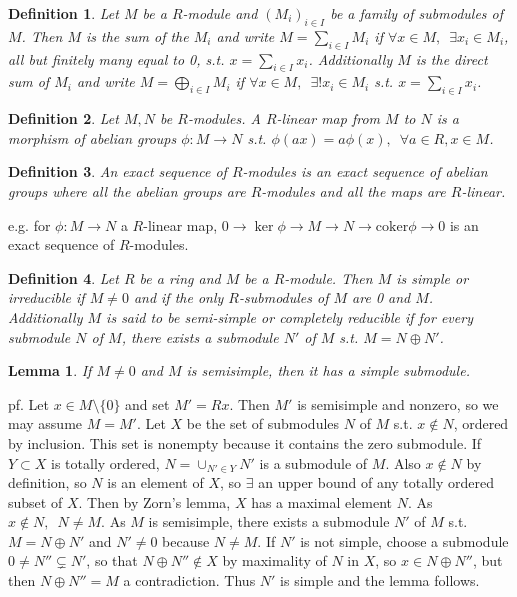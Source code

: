 \documentclass[12pt,letterpaper]{report}
\newtheorem{definition}{Definition}[section]
\newtheorem{lemma}{Lemma}[section]
\begin{document}
\begin{definition}Let $M$ be a $R$-module and $(M_{i})_{i\in I}$ be a family of submodules of $M$. Then $M$ is the sum of the $M_{i}$ and write $M=\sum_{i\in I}M_{i}$ if $\forall x\in M,\,\,\,\exists x_{i}\in M_{i}$, all but finitely many equal to 0, s.t. $x=\sum_{i\in I}x_{i}$. Additionally $M$ is the direct sum of $M_{i}$ and write $M=\bigoplus_{i\in I}M_{i}$ if $\forall x\in M,\,\,\,\exists !x_{i}\in M_{i}$ s.t. $x=\sum_{i\in I}x_{i}$.\end{definition}
\begin{definition}Let $M,N$ be $R$-modules. A $R$-linear map from $M$ to $N$ is a morphism of abelian groups $\phi:M\rightarrow N$ s.t. $\phi(ax)=a\phi(x),\,\,\,\forall a\in R,x\in M$.\end{definition}
\begin{definition}An exact sequence of $R$-modules is an exact sequence of abelian groups where all the abelian groups are $R$-modules and all the maps are $R$-linear.\end{definition}
e.g. for $\phi:M\rightarrow N$ a $R$-linear map, $0\rightarrow\ker\phi\rightarrow M\rightarrow N\rightarrow\text{coker}\phi\rightarrow0$ is an exact sequence of $R$-modules.
\begin{definition}Let $R$ be a ring and $M$ be a $R$-module. Then $M$ is simple or irreducible if $M\neq0$ and if the only $R$-submodules of $M$ are 0 and $M$. Additionally $M$ is said to be semi-simple or completely reducible if for every submodule $N$ of $M$, there exists a submodule $N'$ of $M$ s.t. $M=N\oplus N'$. \end{definition}
\begin{lemma}If $M\neq0$ and $M$ is semisimple, then it has a simple submodule.\end{lemma}
pf. Let $x\in M\setminus\{0\}$ and set $M'=Rx$. Then $M'$ is semisimple and nonzero, so we may assume $M=M'$. Let $X$ be the set of submodules $N$ of $M$ s.t. $x\notin N$, ordered by inclusion. This set is nonempty because it contains the zero submodule. If $Y\subset X$ is totally ordered, $N=\cup_{N'\in Y}N'$ is a submodule of $M$. Also $x\notin N$ by definition, so $N$ is an element of $X$, so $\exists $ an upper bound of any totally ordered subset of $X$. Then by Zorn's lemma, $X$ has a maximal element $N$. As $x\notin N,\,\,\,N\neq M$. As $M$ is semisimple, there exists a submodule $N'$ of $M$ s.t. $M=N\oplus N'$ and $N'\neq 0$ because $N\neq M$. If $N'$ is not simple, choose a submodule $0\neq N''\subsetneq N'$, so that $N\oplus N''\notin X$ by maximality of $N$ in $X$, so $x\in N\oplus N''$, but then $N\oplus N''=M$ a contradiction. Thus $N'$ is simple and the lemma follows.
\end{document}
